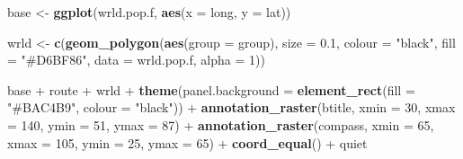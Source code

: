 \documentclass[]{article}
\newenvironment{Shaded}{}{}
\newcommand{\KeywordTok}[1]{\textcolor[rgb]{0.00,0.44,0.13}{\textbf{{#1}}}}
\newcommand{\DataTypeTok}[1]{\textcolor[rgb]{0.56,0.13,0.00}{{#1}}}
\newcommand{\DecValTok}[1]{\textcolor[rgb]{0.25,0.63,0.44}{{#1}}}
\newcommand{\FloatTok}[1]{\textcolor[rgb]{0.25,0.63,0.44}{{#1}}}
\newcommand{\StringTok}[1]{\textcolor[rgb]{0.25,0.44,0.63}{{#1}}}
\newcommand{\NormalTok}[1]{{#1}}
\begin{document}
\begin{Shaded}
\begin{Highlighting}[]
\NormalTok{base <- }\KeywordTok{ggplot}\NormalTok{(wrld.pop.f, }\KeywordTok{aes}\NormalTok{(}\DataTypeTok{x =} \NormalTok{long, }\DataTypeTok{y =} \NormalTok{lat))}
\end{Highlighting}
\end{Shaded}
\begin{Shaded}
\end{Shaded}
\begin{Shaded}
\begin{Highlighting}[]
\NormalTok{wrld <- }\KeywordTok{c}\NormalTok{(}\KeywordTok{geom_polygon}\NormalTok{(}\KeywordTok{aes}\NormalTok{(}\DataTypeTok{group =} \NormalTok{group), }\DataTypeTok{size =} \FloatTok{0.1}\NormalTok{, }\DataTypeTok{colour =} \StringTok{"black"}\NormalTok{, }\DataTypeTok{fill =} \StringTok{"#D6BF86"}\NormalTok{, }
    \DataTypeTok{data =} \NormalTok{wrld.pop.f, }\DataTypeTok{alpha =} \DecValTok{1}\NormalTok{))}
\end{Highlighting}
\end{Shaded}
\begin{Shaded}
\begin{Highlighting}[]
\NormalTok{base + route + wrld + }\KeywordTok{theme}\NormalTok{(}\DataTypeTok{panel.background =} \KeywordTok{element_rect}\NormalTok{(}\DataTypeTok{fill =} \StringTok{"#BAC4B9"}\NormalTok{, }
    \DataTypeTok{colour =} \StringTok{"black"}\NormalTok{)) + }\KeywordTok{annotation_raster}\NormalTok{(btitle, }\DataTypeTok{xmin =} \DecValTok{30}\NormalTok{, }\DataTypeTok{xmax =} \DecValTok{140}\NormalTok{, }\DataTypeTok{ymin =} \DecValTok{51}\NormalTok{, }
    \DataTypeTok{ymax =} \DecValTok{87}\NormalTok{) + }\KeywordTok{annotation_raster}\NormalTok{(compass, }\DataTypeTok{xmin =} \DecValTok{65}\NormalTok{, }\DataTypeTok{xmax =} \DecValTok{105}\NormalTok{, }\DataTypeTok{ymin =} \DecValTok{25}\NormalTok{, }
    \DataTypeTok{ymax =} \DecValTok{65}\NormalTok{) + }\KeywordTok{coord_equal}\NormalTok{() + quiet}
\end{Highlighting}
\end{Shaded}
\end{document}
